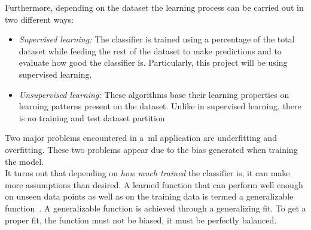 Furthermore, depending on the dataset the learning process can be carried out in two different ways:
\begin{itemize}
	\item \textit{Supervised learning:} \label{ml:super}The classifier is trained using a percentage of the total dataset while feeding the rest of the dataset to make predictions and to evaluate how good the classifier is. Particularly, this project will be using supervised learning.
	
	\item \textit{Unsupervised learning:} These algorithms base their learning properties on learning patterns present on the dataset. Unlike in supervised learning, there is no training and test dataset partition
\end{itemize}
Two major problems encountered in a~\ac{ml} application are underfitting and overfitting. These two problems appear due to the bias generated when training the model.\\
It turns out that depending on \textit{how much trained} the classifier is, it can make more assumptions than desired. A learned function that can perform well enough on unseen data points as well as on the training data is termed a generalizable function~\cite{gs}. A generalizable function is achieved through a generalizing fit. To get a proper fit, the function must not be biased, it must be perfectly balanced. 

